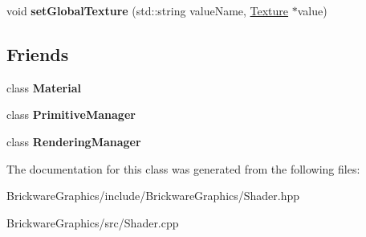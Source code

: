 \begin{DoxyCompactItemize}
\item 
\hypertarget{classBrickware_1_1Graphics_1_1Shader_a0328774a08bd4dd883339d5a00101894}{}void {\bfseries set\+Global\+Texture} (std\+::string value\+Name, \hyperlink{classBrickware_1_1Graphics_1_1Texture}{Texture} $\ast$value)\label{classBrickware_1_1Graphics_1_1Shader_a0328774a08bd4dd883339d5a00101894}

\end{DoxyCompactItemize}
\subsection*{Friends}
\begin{DoxyCompactItemize}
\item 
\hypertarget{classBrickware_1_1Graphics_1_1Shader_aa1212b6e372a0f45d2c01f3cd203af77}{}class {\bfseries Material}\label{classBrickware_1_1Graphics_1_1Shader_aa1212b6e372a0f45d2c01f3cd203af77}

\item 
\hypertarget{classBrickware_1_1Graphics_1_1Shader_a6046fab128ff98a4d4a4ccd3083fcc1a}{}class {\bfseries Primitive\+Manager}\label{classBrickware_1_1Graphics_1_1Shader_a6046fab128ff98a4d4a4ccd3083fcc1a}

\item 
\hypertarget{classBrickware_1_1Graphics_1_1Shader_af97d60083cbec9dff36ea5566c308d6d}{}class {\bfseries Rendering\+Manager}\label{classBrickware_1_1Graphics_1_1Shader_af97d60083cbec9dff36ea5566c308d6d}

\end{DoxyCompactItemize}


The documentation for this class was generated from the following files\+:\begin{DoxyCompactItemize}
\item 
Brickware\+Graphics/include/\+Brickware\+Graphics/Shader.\+hpp\item 
Brickware\+Graphics/src/Shader.\+cpp\end{DoxyCompactItemize}

